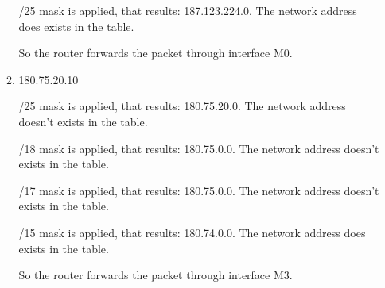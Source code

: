 \documentclass{article}
\begin{document}
\begin{enumerate}
\begin{enumerate}
    /25 mask is applied, that results: 187.123.224.0. The network address does exists in the table.

    So the router forwards the packet through interface M0.

    \item 180.75.20.10

    /25 mask is applied, that results: 180.75.20.0. The network address doesn't exists in the table.

    /18 mask is applied, that results: 180.75.0.0. The network address doesn't exists in the table.

    /17 mask is applied, that results: 180.75.0.0. The network address doesn't exists in the table.

    /15 mask is applied, that results: 180.74.0.0. The network address does exists in the table.

    So the router forwards the packet through interface M3.

  \end{enumerate}
\end{enumerate}
\end{document}

